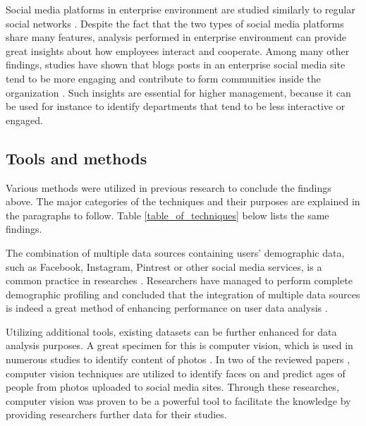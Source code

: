 Social media platforms in enterprise environment are studied similarly to regular social networks \cite{guy2016whatsyourorganizationlike}. Despite the fact that the two types of social media platforms share many features, analysis performed in enterprise environment can provide great insights about how employees interact and cooperate. Among many other findings, studies have shown that blogs posts in an enterprise social media site tend to be more engaging and contribute to form communities inside the organization \cite{guy2016whatsyourorganizationlike}. Such insights are essential for higher management, because it can be used for instance to identify departments that tend to be less interactive or engaged.  

\subsection{Tools and methods}
Various methods were utilized in previous research to conclude the findings above. The major categories of the techniques and their purposes are explained in the paragraphs to follow. Table \ref{table_of_techniques} below lists the same findings.

   The combination of multiple data sources containing users' demographic data, such as Facebook, Instagram, Pintrest or other social media services, is a common practice in researches \cite{farseev2015harvestingmultiplesources, ottoni2013ladies}. Researchers have managed to perform complete demographic profiling and concluded that the integration of multiple data sources is indeed a great method of enhancing performance on user data analysis \cite{farseev2015harvestingmultiplesources}. 
  
  Utilizing additional tools, existing datasets can be further enhanced for data analysis purposes. A great specimen for this is computer vision, which is used in numerous studies to identify content of photos \cite{hu2014we, farseev2015harvestingmultiplesources}. In two of the reviewed papers \cite{han2016teensarefrommars, bakhshi2014faces}, computer vision techniques are utilized to identify faces on and predict ages of people from photos uploaded to social media sites. Through these researches, computer vision was proven to be a powerful tool to facilitate the knowledge by providing researchers further data for their studies. 

